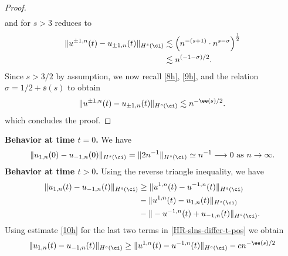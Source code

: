 \begin{proof}
\begin{equation}
\begin{split}
				\end{split}
			\end{equation}
			and for $s > 3$ reduces to 
			\begin{equation}
				\begin{split}
					\|u^{\pm 1,n}(t) - u_{\pm 1, n}(t) \|_{H^s (\ci)}
					& \lesssim \left( n^{-\left( s+1 \right)} \cdot
					n^{s-\sigma}
					\right)^{\frac{1}{2}}
					\\
					& \lesssim n^{(-1-\sigma)/2}.
					\label{9h}
				\end{split}
			\end{equation}
			Since $s > 3/2 $ by assumption, we now recall \eqref{8h},
			\eqref{9h}, and the
			relation $\sigma = 1/2 + \ee(s)$ to obtain 
			\begin{equation}
				\begin{split}
					\|u^{\pm 1,n}(t) - u_{\pm 1, n}(t) \|_{H^s (\ci)} \lesssim
					n^{-\ee(s)/2}.
					\label{10h}
				\end{split}
			\end{equation}
      which concludes the proof. 
    \end{proof}
%
%
%  
%
\textbf{Behavior at time $t=0$.}  We have
%
%
\begin{equation} 
	\label{HR-slns-differ-t-0} 
	\|
	u_{1, n}(0)
	-
	u_{-1, n}(0)
	\|_{H^s(\ci)}
	=
	\|
	2   n^{-1}
	\|_{H^s(\ci)}
	\simeq
	n^{-1}
	\longrightarrow 
	0
	\,\,
	\text{as}
	\,\,
	n \to \infty.
\end{equation}
%
%
%  
%
\textbf{Behavior at time  $t>0$.}  Using the reverse triangle inequality, we 
have
%
%
%
\begin{equation} 
	\label{HR-slns-differ-t-pos}
	\begin{split}
		\|
		u_{1, n}(t)
		-
		u_{- 1, n}(t)
		\|_{H^s(\ci)}
		&
		\ge
		\|
		u^{1, n}(t)
		-
		u^{- 1, n}(t)
		\|_{H^s(\ci)}
		\\
		&
		-
		\|
		u^{1, n}(t)
		-
		u_{1, n}(t)
		\|_{H^s(\ci)}
		\\
		&
		-
		\|
		-u^{-1, n}(t)
		+
		u_{-1, n}(t)
		\|_{H^s(\ci)} .
	\end{split}
\end{equation}
%
%
Using estimate \eqref{10h} for the last two terms 
in \eqref{HR-slns-differ-t-pos} we obtain
%
%
%
\begin{equation} 
	\label{HR-slns-differ-t-pos-est}
	\|
	u_{1, n}(t)
	-
	u_{- 1, n}(t)
	\|_{H^s(\ci)}
	\ge
	\|
	u^{1, n}(t)
	-
	u^{- 1, n}(t)
	\|_{H^s(\ci)}
	-
	c n^{- \ee(s)/2}
\end{equation}
